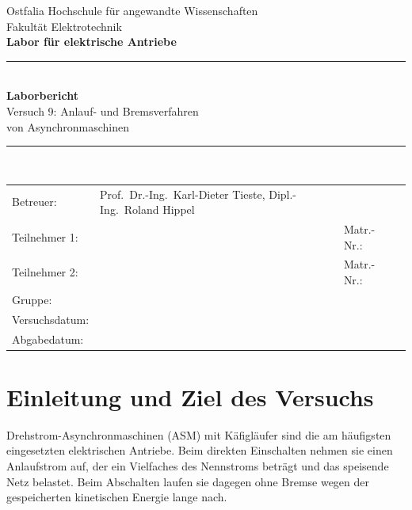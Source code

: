 \documentclass[11pt,a4paper]{article}
\begin{document}
\begin{titlepage}
\thispagestyle{empty}
\begin{center}
{\large Ostfalia Hochschule für angewandte Wissenschaften}\\[2pt]
{\large Fakultät Elektrotechnik}\\[1.2cm]
{\Large\bfseries Labor für elektrische Antriebe}\\[1.6cm]
\rule{\textwidth}{0.8pt}\\[0.4cm]
{\huge\bfseries Laborbericht}\\[0.4cm]
{\LARGE Versuch 9: Anlauf- und Bremsverfahren}\\[0.2cm]
{\large von Asynchronmaschinen}\\[0.3cm]
\rule{\textwidth}{0.8pt}\\[1.6cm]
\end{center}

\renewcommand{\arraystretch}{1.9}
\begin{tabularx}{\textwidth}{@{}l X l l@{}}
Betreuer: & Prof.\ Dr.-Ing.\ Karl-Dieter Tieste, Dipl.-Ing.\ Roland Hippel & & \\[6pt]
Teilnehmer 1: & \hrulefill & Matr.-Nr.: & \rule{2.4cm}{0.4pt}\\
Teilnehmer 2: & \hrulefill & Matr.-Nr.: & \rule{2.4cm}{0.4pt}\\[6pt]
Gruppe: & \hrulefill & & \\
Versuchsdatum: & \hrulefill & & \\
Abgabedatum: & \hrulefill & & \\
\end{tabularx}
\renewcommand{\arraystretch}{1}
\vfill
\end{titlepage}

\tableofcontents
\newpage

\section{Einleitung und Ziel des Versuchs}
Drehstrom-Asynchronmaschinen (ASM) mit Käfigläufer sind die am häufigsten
eingesetzten elektrischen Antriebe. Beim direkten Einschalten nehmen sie einen
Anlaufstrom auf, der ein Vielfaches des Nennstroms beträgt und das speisende Netz
belastet. Beim Abschalten laufen sie dagegen ohne Bremse wegen der gespeicherten
kinetischen Energie lange nach.
\end{document}
